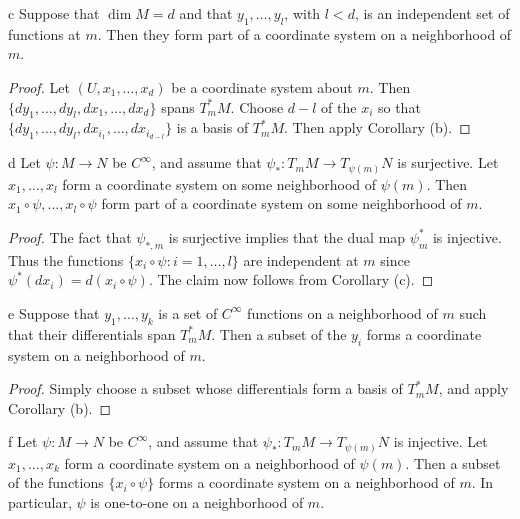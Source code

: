 \begin{corollary*}{c}
	Suppose that $\dim M = d$ and that $y_{1}, \ldots, y_{l}$, with $l < d$, is an independent set of functions at $m$. Then they form part of a coordinate system on a neighborhood of $m$.
\end{corollary*}

\begin{proof}
	Let $(U, x_1, \ldots, x_d)$ be a coordinate system about $m$. Then $\{dy_1, \ldots, dy_l, dx_1, \ldots, dx_d\}$ spans $T_{m}^{*} M$. Choose $d-l$ of the $x_i$ so that $\{dy_1, \ldots, dy_l, dx_{i_1}, \ldots, dx_{i_{d-l}}\}$ is a basis of $T_{m}^{*} M$. Then apply Corollary (b).
\end{proof}

\begin{corollary*}{d}
	Let $\psi\colon M \to N$ be $C^{\infty}$, and assume that $\psi_{*}\colon T_{m} M \to T_{\psi(m)} N$ is surjective. Let $x_{1}, \ldots, x_{l}$ form a coordinate system on some neighborhood of $\psi(m)$. Then $x_{1} \circ \psi, \ldots, x_{l} \circ \psi$ form part of a coordinate system on some neighborhood of $m$.
\end{corollary*}

\begin{proof}
	The fact that $\psi_{*,m}$ is surjective implies that the dual map $\psi_m^{*}$ is injective. Thus the functions $\{x_{i}\circ\psi\colon i=1,\ldots,l\}$ are independent at $m$ since $\psi^{*}(dx_{i})=d(x_{i}\circ\psi)$. The claim now follows from Corollary (c).
\end{proof}

\begin{corollary*}{e}
	Suppose that $y_{1},\ldots,y_{k}$ is a set of $C^{\infty}$ functions on a neighborhood of $m$ such that their differentials span $T_{m}^{*} M$. Then a subset of the $y_{i}$ forms a coordinate system on a neighborhood of $m$.
\end{corollary*}

\begin{proof}
	Simply choose a subset whose differentials form a basis of $T_{m}^{*} M$, and apply Corollary (b).
\end{proof}

\begin{corollary*}{f}
	Let $\psi\colon M \to N$ be $C^{\infty}$, and assume that $\psi_{*}\colon T_{m} M \to T_{\psi(m)} N$ is injective. Let $x_{1}, \ldots, x_{k}$ form a coordinate system on a neighborhood of $\psi(m)$. Then a subset of the functions $\{x_{i} \circ \psi\}$ forms a coordinate system on a neighborhood of $m$. In particular, $\psi$ is one-to-one on a neighborhood of $m$.
\end{corollary*}

